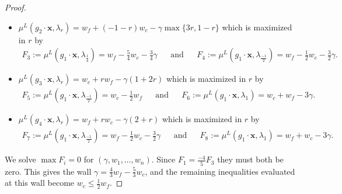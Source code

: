 \documentclass{amsart}
\numberwithin{equation}{section}
\theoremstyle{definition}
\begin{document}
\begin{proof}
\begin{itemize}
     
     \item $\mu^L(g_2 \cdot \mathbf{x}, \lambda_r) = w_f + (-1-r)w_c - \gamma \max \{3r, 1-r \}$
     which is maximized in $r$ by
     \begin{align*}
        F_3 := \mu^L(g_1 \cdot \mathbf{x}, \lambda_{\frac{1}{4}}) = w_f - \frac{5}{4}w_c - \frac{3}{4} \gamma 
        && \text{and} &&
        F_4 := \mu^L(g_1 \cdot \mathbf{x}, \lambda_{\frac{-1}{2}}) = w_f - \frac{1}{2} w_c - \frac{3}{2} \gamma.
     \end{align*}

     
     \item $\mu^L(g_3 \cdot \mathbf{x}, \lambda_r) = w_c + r w_f - \gamma (1+2r)$
     which is maximized in $r$ by
     \begin{align*}
        F_5 := \mu^L(g_1 \cdot \mathbf{x}, \lambda_{\frac{-1}{2}})= w_c - \frac{1}{2} w_f 
        && \text{and} &&
        F_6 := \mu^L(g_1 \cdot \mathbf{x}, \lambda_1) = w_c + w_f - 3 \gamma.
     \end{align*}

     
     \item $\mu^L(g_4 \cdot \mathbf{x}, \lambda_r) = w_f + r w_c - \gamma(2+r) $
     which is maximized in $r$ by
     \begin{align*}
        F_7 := \mu^L(g_1 \cdot \mathbf{x}, \lambda_{\frac{-1}{2}}) = w_f - \frac{1}{2}w_c - \frac{3}{2} \gamma 
        && \text{and} &&
        F_8 := \mu^L(g_1 \cdot \mathbf{x}, \lambda_1) = w_f + w_c - 3\gamma .
     \end{align*}
 \end{itemize}
 We solve $\max{F_i}= 0$ for $(\gamma, w_1, \dots, w_n).$ Since $F_1 = \frac{-4}{5}F_3$ they must both be zero. This gives the wall $\gamma = \frac{4}{3}w_f - \frac{5}{3}w_c$, and the remaining inequalities evaluated at this wall become $w_c \leq \frac{1}{2}w_f.$

 






\end{proof}
\end{document}

